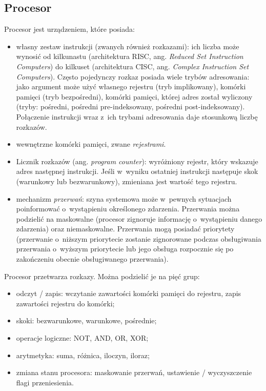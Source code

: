 \documentclass[12pt]{mwart}
\begin{document}
\subsection{Procesor}
%
\indent
	Procesor jest urządzeniem, które posiada:
	\begin{itemize}
		\item własny zestaw instrukcji (zwanych również rozkazami): ich liczba może wynosić od kilkunastu (architektura RISC, 
			ang. \emph{Reduced Set Instruction Computers}) do kilkuset (architektura CISC, ang.
			\emph{Complex Instruction Set Computers}). Często pojedynczy rozkaz posiada wiele trybów adresowania: jako argument
			może użyć własnego rejestru (tryb implikowany), komórki pamięci (tryb bezpośredni), komórki pamięci, której adres został wyliczony
			(tryby: pośredni, pośredni pre-indeksowany, pośredni post-indeksowany). Połączenie instrukcji wraz z~ich trybami adresowania daje 
			stosunkową liczbę rozkazów.
		\item wewnętrzne komórki pamięci, zwane \emph{rejestrami}.
		\item Licznik rozkazów (ang. \emph{program counter}): wyróżniony rejestr, który wskazuje adres następnej instrukcji. 
			Jeśli w~wyniku ostatniej instrukcji następuje skok (warunkowy lub bezwarunkowy), zmieniana jest wartość tego rejestru.
		\item mechanizm \emph{przerwań}: szyna systemowa może w~pewnych sytuacjach poinformować o~wystąpieniu określonego zdarzenia.
			Przerwania można podzielić na maskowalne (procesor zignoruje informację o~wystąpieniu danego zdarzenia) oraz niemaskowalne.
			Przerwania mogą posiadać priorytety (przerwanie o~niższym priorytecie zostanie zignorowane podczas obsługiwania przerwania
			o~wyższym priorytecie lub jego obsługa rozpocznie się po zakończeniu obecnie obsługiwanego przerwania).
	\end{itemize}
\par
%
\indent
	Procesor przetwarza rozkazy. Można podzielić je na pięć grup:
	\begin{itemize}
		\item odczyt / zapis: wczytanie zawartości komórki pamięci do rejestru, zapis zawartości rejestru do komórki;
		\item skoki: bezwarunkowe, warunkowe, pośrednie;
		\item operacje logiczne: NOT, AND, OR, XOR;
		\item arytmetyka: suma, różnica, iloczyn, iloraz;
		\item zmiana stanu procesora: maskowanie przerwań, ustawienie / wyczyszczenie flagi przeniesienia.
	\end{itemize}
\end{document}
